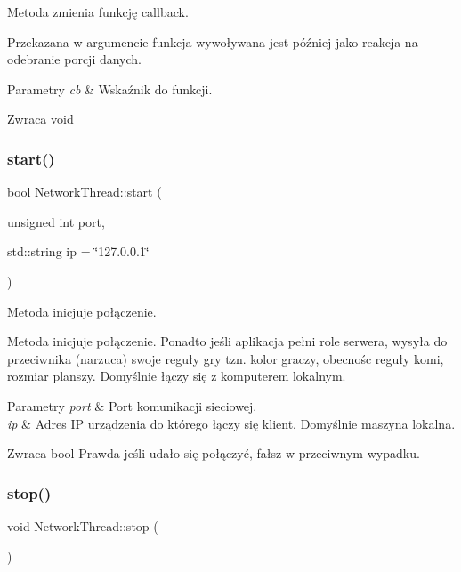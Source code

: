 Metoda zmienia funkcję callback. 

Przekazana w argumencie funkcja wywoływana jest później jako reakcja na odebranie porcji danych. 
\begin{DoxyParams}{Parametry}
{\em cb} & Wskaźnik do funkcji. \\
\hline
\end{DoxyParams}
\begin{DoxyReturn}{Zwraca}
void 
\end{DoxyReturn}
\mbox{\label{class_network_thread_a442c3061e4f8e5013ae38022c0e62e5a}} 
\subsubsection{start()}
{\footnotesize\ttfamily bool Network\+Thread\+::start (\begin{DoxyParamCaption}\item[{unsigned int}]{port,  }\item[{std\+::string}]{ip = {\ttfamily \char`\"{}127.0.0.1\char`\"{}} }\end{DoxyParamCaption})}



Metoda inicjuje połączenie. 

Metoda inicjuje połączenie. Ponadto jeśli aplikacja pełni role serwera, wysyła do przeciwnika (narzuca) swoje reguły gry tzn. kolor graczy, obecnośc reguły komi, rozmiar planszy. Domyślnie łączy się z komputerem lokalnym. 
\begin{DoxyParams}{Parametry}
{\em port} & Port komunikacji sieciowej. \\
\hline
{\em ip} & Adres IP urządzenia do którego łączy się klient. Domyślnie maszyna lokalna. \\
\hline
\end{DoxyParams}
\begin{DoxyReturn}{Zwraca}
bool Prawda jeśli udało się połączyć, fałsz w przeciwnym wypadku. 
\end{DoxyReturn}
\mbox{\label{class_network_thread_ad00403b687698c2f3e1ed09a09bf1b41}} 
\subsubsection{stop()}
{\footnotesize\ttfamily void Network\+Thread\+::stop (\begin{DoxyParamCaption}{ }\end{DoxyParamCaption})}



